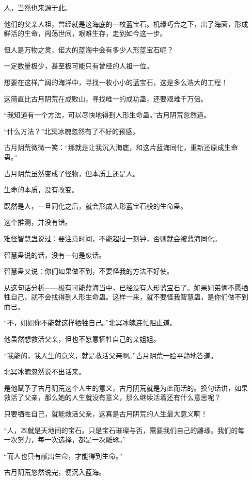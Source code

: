 \begin{this_body}
人，当然也来源于此。

他们的父亲人祖，曾经就是这海底的一枚蓝宝石。机缘巧合之下，出了海面，形成鲜活的生命，闯荡世间，艰难生存，走到如今这一步。

但人是万物之灵，偌大的蓝海中会有多少人形蓝宝石呢？

一定数量极少，甚至极可能只有曾经的人祖一位。

想要在这样广阔的海洋中，寻找一枚小小的蓝宝石，这是多么浩大的工程！

这简直比古月阴荒在成败山，寻找唯一的成功蛊，还要艰难千万倍。

“我知道有一个方法，可以尽快地得到人形生命蛊。”古月阴荒忽然道。

“什么方法？”北冥冰魄忽然有了不好的预感。

古月阴荒微微一笑：“那就是让我沉入海底，和这片蓝海同化，重新还原成生命蛊。”

古月阴荒虽然变成了怪物，但本质上还是人。

生命的本质，没有改变。

既然是人，一旦同化之后，就会形成人形蓝宝石般的生命蛊。

这个推测，并没有错。

难怪智慧蛊说过：要注意时间，不能超过一刻钟，否则就会被蓝海同化。

智慧蛊说的话，没有一句是废话。

智慧蛊又说：你们如果做不到，不要怪我的方法不好使。

从这句话分析——极有可能蓝海当中，已经没有人形蓝宝石了。如果姐弟俩不愿牺牲自己，就不会找得到人形生命蛊。这样一来，就不要怪我智慧蛊，是你们做不到而已。

“不，姐姐你不能就这样牺牲自己。”北冥冰魄连忙阻止道。

他虽然想救活父亲，但也不愿意牺牲自己的亲姐姐。

“我能的，我人生的意义，就是救活父亲啊。”古月阴荒一脸平静地答道。

北冥冰魄忽然说不出话来。

是他赋予了古月阴荒这个人生的意义，古月阴荒就是为此而活的。换句话讲，如果救活了父亲，那么她的人生就没有意义，那么继续活着还有什么意思呢？

只要牺牲自己，就能救活父亲，这真是古月阴荒的人生最大意义啊！

“人，本就是天地间的宝石。只是宝石璀璨与否，需要我们自己的雕琢。我们的每一次努力，每一次选择，都是一次雕琢。”

“而人也只有献出生命，才能得到生命。”

古月阴荒悠然说完，便沉入蓝海。


\end{this_body}
